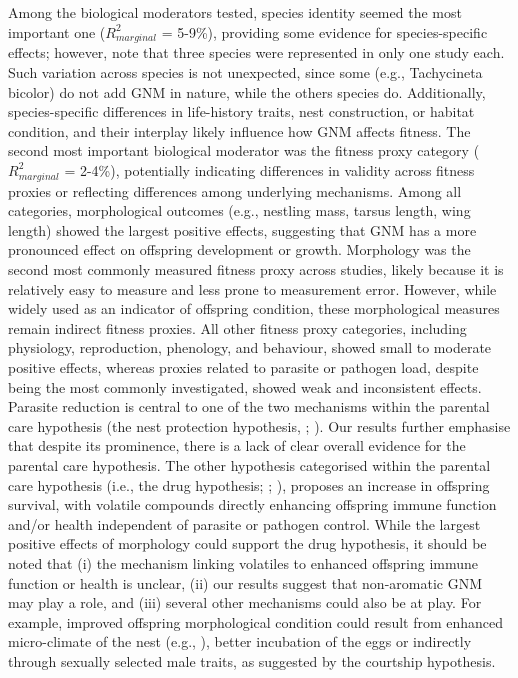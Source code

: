 \documentclass[
  number,
  review,
  onecolumn]{elsarticle}
\begin{document}
Among the biological moderators tested, species identity seemed the most
important one (\(R^2_{marginal}\) = 5-9\%), providing some evidence for
species-specific effects; however, note that three species were
represented in only one study each. Such variation across species is not
unexpected, since some (e.g., Tachycineta bicolor) do not add GNM in
nature, while the others species do. Additionally, species-specific
differences in life-history traits, nest construction, or habitat
condition, and their interplay likely influence how GNM affects fitness.
The second most important biological moderator was the fitness proxy
category (\(R^2_{marginal}\) = 2-4\%), potentially indicating
differences in validity across fitness proxies or reflecting differences
among underlying mechanisms. Among all categories, morphological
outcomes (e.g., nestling mass, tarsus length, wing length) showed the
largest positive effects, suggesting that GNM has a more pronounced
effect on offspring development or growth. Morphology was the second
most commonly measured fitness proxy across studies, likely because it
is relatively easy to measure and less prone to measurement error.
However, while widely used as an indicator of offspring condition, these
morphological measures remain indirect fitness proxies. All other
fitness proxy categories, including physiology, reproduction, phenology,
and behaviour, showed small to moderate positive effects, whereas
proxies related to parasite or pathogen load, despite being the most
commonly investigated, showed weak and inconsistent effects. Parasite
reduction is central to one of the two mechanisms within the parental
care hypothesis (the nest protection hypothesis, \citep{wimberger1984};
\citep{clark1985}). Our results further emphasise that despite its
prominence, there is a lack of clear overall evidence for the parental
care hypothesis. The other hypothesis categorised within the parental
care hypothesis (i.e., the drug hypothesis; \citep{gwinner2000} ;
\citep{mennerat2009a}), proposes an increase in offspring survival, with
volatile compounds directly enhancing offspring immune function and/or
health independent of parasite or pathogen control. While the largest
positive effects of morphology could support the drug hypothesis, it
should be noted that (i) the mechanism linking volatiles to enhanced
offspring immune function or health is unclear, (ii) our results suggest
that non-aromatic GNM may play a role, and (iii) several other
mechanisms could also be at play. For example, improved offspring
morphological condition could result from enhanced micro-climate of the
nest (e.g., \citep{corregidor-castro2021}), better incubation of the
eggs or indirectly through sexually selected male traits, as suggested
by the courtship hypothesis.
\end{document}
